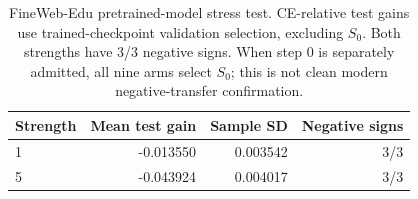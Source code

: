 \begin{table}[htbp]
\centering\small
\begin{tabular}{lrrr}
\toprule
Strength & Mean test gain & Sample SD & Negative signs \\
\midrule
1 & -0.013550 & 0.003542 & 3/3 \\
5 & -0.043924 & 0.004017 & 3/3 \\
\bottomrule
\end{tabular}
\caption{FineWeb-Edu pretrained-model stress test. CE-relative test gains use trained-checkpoint validation selection, excluding $S_0$. Both strengths have 3/3 negative signs. When step 0 is separately admitted, all nine arms select $S_0$; this is not clean modern negative-transfer confirmation.}
\label{tab:modern_stress}
\end{table}
